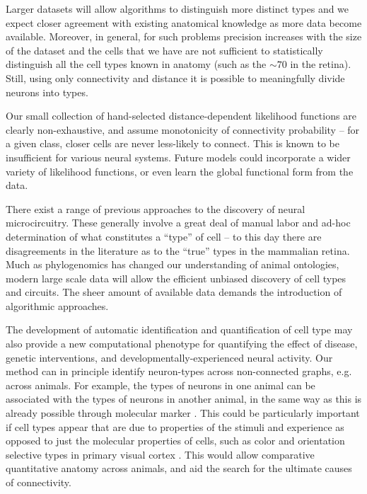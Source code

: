 \documentclass{article}
\begin{document}
{Larger datasets will allow algorithms to distinguish more distinct
types and we expect closer agreement with existing anatomical
knowledge as more data become available.  Moreover, in general, for
such problems precision increases with the size of the dataset and the
cells that we have are not sufficient to statistically distinguish all
the cell types known in anatomy (such as the $\sim 70$ in the
retina). Still, using only connectivity and distance it is possible to
meaningfully divide neurons into types.

Our small collection of hand-selected distance-dependent likelihood
functions are clearly non-exhaustive, and assume monotonicity
of connectivity probability -- for a given class, closer cells
are never less-likely to connect. This is known to be insufficient
for various neural systems. Future models could incorporate
a wider variety of likelihood functions, or even learn the global
functional form from the data. 

There exist a range of previous approaches to the discovery of neural
microcircuitry\autocite{Mountcastle1957, Douglas1991, Bartho2004,
  Freund1998}.  These generally involve a great deal of manual labor
and ad-hoc determination of what constitutes a “type” of cell -- to
this day there are disagreements in the literature as to the “true”
types in the mammalian retina. Much as phylogenomics has changed our
understanding of animal ontologies, modern large scale data will allow
the efficient unbiased discovery of cell types and circuits. The sheer
amount of available data demands the introduction of algorithmic
approaches.

The development of automatic identification and quantification of cell
type may also provide a new computational phenotype for quantifying
the effect of disease, genetic interventions, and
developmentally-experienced neural activity. Our method can in
principle identify neuron-types across non-connected graphs,
e.g. across animals. For example, the types of neurons in one animal
can be associated with the types of neurons in another animal, in the
same way as this is already possible through molecular marker
\autocite{Brown2009}. This could be particularly important if cell
types appear that are due to properties of the stimuli and experience
as opposed to just the molecular properties of cells, such as color
and orientation selective types in primary visual cortex
\autocite{Sincich2005,Lennie2005}. This would allow comparative
quantitative anatomy across animals, and aid the search for the
ultimate causes of connectivity.

}
\end{document}
